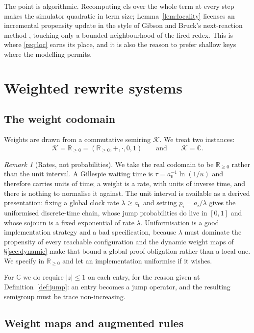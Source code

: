 \documentclass[11pt,a4paper]{article}
\theoremstyle{plain}
\theoremstyle{definition}
\theoremstyle{remark}
\newtheorem{remark}[theorem]{Remark}
\newcommand{\Rnn}{\mathbb{R}_{\geq 0}}
\newcommand{\Cx}{\mathbb{C}}
\newcommand{\class}{\mathrm{cls}}
\begin{document}
The point is algorithmic. Recomputing $\class$ over the whole term at every step makes the simulator
quadratic in term size; Lemma~\ref{lem:locality} licenses an incremental propensity update in the
style of Gibson and Bruck's next-reaction method \cite{gibson-bruck}, touching only a bounded
neighbourhood of the fired redex. This is where \ref{req:loc} earns its place, and it is also the
reason to prefer shallow keys where the modelling permits.

\section{Weighted rewrite systems}
\label{sec:weighted}

\subsection{The weight codomain}

Weights are drawn from a commutative semiring $\mathcal{K}$. We treat two instances:
\[
\mathcal{K} = \Rnn = (\Rnn, +, \cdot, 0, 1)
\qquad\text{and}\qquad
\mathcal{K} = \Cx .
\]

\begin{remark}[Rates, not probabilities]
\label{rem:rnn}
We take the real codomain to be $\Rnn$ rather than the unit interval. A Gillespie waiting time is
$\tau = a_0^{-1}\ln(1/u)$ and therefore carries units of time; a weight is a rate, with units of
inverse time, and there is nothing to normalise it against. The unit interval is available as a
derived presentation: fixing a global clock rate $\lambda \geq a_0$ and setting
$p_i = a_i / \lambda$ gives the uniformised discrete-time chain, whose jump probabilities do live in
$[0,1]$ and whose sojourn is a fixed exponential of rate $\lambda$. Uniformisation is a good
implementation strategy and a bad specification, because $\lambda$ must dominate the propensity of
every reachable configuration and the dynamic weight maps of \S\ref{sec:dynamic} make that bound a
global proof obligation rather than a local one. We specify in $\Rnn$ and let an implementation
uniformise if it wishes.
\end{remark}

For $\Cx$ we do require $|z| \le 1$ on each entry, for the reason given at
Definition~\ref{def:jump}: an entry becomes a jump operator, and the resulting semigroup must be
trace non-increasing.

\subsection{Weight maps and augmented rules}
\end{document}
